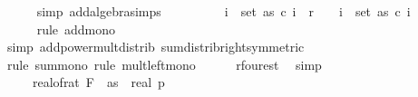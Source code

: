 \begin{isabellebody}
\ \ \ \ \isamarkupfalse%
\ {\isacharparenleft}{\kern0pt}simp\ add{\isacharcolon}{\kern0pt}algebra{\isacharunderscore}{\kern0pt}simps{\isacharparenright}{\kern0pt}\isanewline
\ \ \isamarkupfalse%
\ \isamarkupfalse%
\ {\isachardoublequoteopen}{\isachardot}{\kern0pt}{\isachardot}{\kern0pt}{\isachardot}{\kern0pt}\ {\isasymle}\ {}\ {\isacharasterisk}{\kern0pt}\ {\isacharparenleft}{\kern0pt}{\isasymSum}i\ {\isasymin}\ set\ as{\isachardot}{\kern0pt}\ c\ i{\isacharcircum}{\kern0pt}{}{\isacharparenright}{\kern0pt}{\isacharcircum}{\kern0pt}{}\ {\isacharasterisk}{\kern0pt}\ {\isacharparenleft}{\kern0pt}r\ {}{\isacharparenright}{\kern0pt}{\isacharcircum}{\kern0pt}{}\ {\isacharplus}{\kern0pt}\ \ {\isacharparenleft}{\kern0pt}{\isasymSum}i\ {\isasymin}\ set\ as{\isachardot}{\kern0pt}\ c\ i\ {\isacharcircum}{\kern0pt}\ {}\ {\isacharasterisk}{\kern0pt}\ {}{\isacharparenright}{\kern0pt}{\isachardoublequoteclose}\isanewline
\ \ \ \ \isamarkupfalse%
\ {\isacharparenleft}{\kern0pt}rule\ add{\isacharunderscore}{\kern0pt}mono{\isacharparenright}{\kern0pt}\isanewline
\ \ \ \ \ \isamarkupfalse%
\ {\isacharparenleft}{\kern0pt}simp\ add{\isacharcolon}{\kern0pt}power{\isacharunderscore}{\kern0pt}mult{\isacharunderscore}{\kern0pt}distrib\ sum{\isacharunderscore}{\kern0pt}distrib{\isacharunderscore}{\kern0pt}right{\isacharbrackleft}{\kern0pt}symmetric{\isacharbrackright}{\kern0pt}{\isacharparenright}{\kern0pt}\isanewline
\ \ \ \ \isamarkupfalse%
\ {\isacharparenleft}{\kern0pt}rule\ sum{\isacharunderscore}{\kern0pt}mono{\isacharcomma}{\kern0pt}\ rule\ mult{\isacharunderscore}{\kern0pt}left{\isacharunderscore}{\kern0pt}mono{\isacharparenright}{\kern0pt}\isanewline
\ \ \ \ \isamarkupfalse%
\ r{\isacharunderscore}{\kern0pt}four{\isacharunderscore}{\kern0pt}est\ \isamarkupfalse%
\ simp{\isacharplus}{\kern0pt}\isanewline
\ \ \isamarkupfalse%
\ \isamarkupfalse%
\ {\isachardoublequoteopen}{\isachardot}{\kern0pt}{\isachardot}{\kern0pt}{\isachardot}{\kern0pt}\ {\isacharequal}{\kern0pt}\ {}\ {\isacharasterisk}{\kern0pt}\ {\isacharparenleft}{\kern0pt}real{\isacharunderscore}{\kern0pt}of{\isacharunderscore}{\kern0pt}rat\ {\isacharparenleft}{\kern0pt}F\ {}\ as{\isacharparenright}{\kern0pt}{\isacharcircum}{\kern0pt}{}{\isacharparenright}{\kern0pt}\ {\isacharasterisk}{\kern0pt}\ {\isacharparenleft}{\kern0pt}{\isacharparenleft}{\kern0pt}real\ p{\isacharparenright}{\kern0pt}\ \isanewline

\end{isabellebody}
